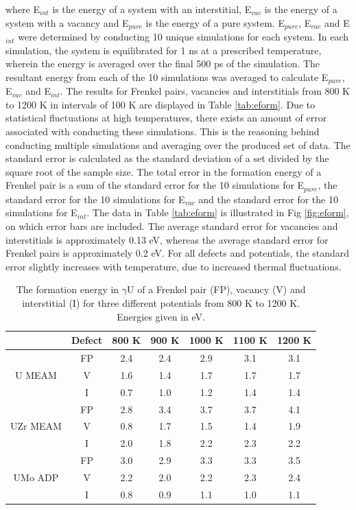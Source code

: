\documentclass[review]{elsarticle}
\begin{document}
where E$_{int}$ is the energy of a system with an interstitial, E$_{vac}$ is the energy of a system with a vacancy and E$_{pure}$ is the energy of a pure system. E$_{pure}$, E$_{vac}$ and E$_{int}$ were determined by conducting 10 unique simulations for each system. In each simulation, the system is equilibrated for 1 ns at a prescribed temperature, wherein the energy is averaged over the final 500 ps of the simulation. The resultant energy from each of the 10 simulations was averaged to calculate E$_{pure}$, E$_{vac}$ and E$_{int}$. The results for Frenkel pairs, vacancies and interstitials from 800 K to 1200 K in intervals of 100 K are displayed in Table \ref{tab:eform}. Due to statistical fluctuations at high temperatures, there exists an amount of error associated with conducting these simulations. This is the reasoning behind conducting multiple simulations and averaging over the produced set of data. The standard error is calculated as the standard deviation of a set divided by the square root of the sample size. The total error in the formation energy of a Frenkel pair is a sum of the standard error for the 10 simulations for E$_{pure}$, the standard error for the 10 simulations for E$_{vac}$ and the standard error for the 10 simulations for E$_{int}$. The data in Table \ref{tab:eform} is illustrated in Fig \ref{fig:eform}, on which error bars are included. The average standard error for vacancies and interstitials is approximately 0.13 eV, whereas the average standard error for Frenkel pairs is approximately 0.2 eV. For all defects and potentials, the standard error slightly increases with temperature, due to increased thermal fluctuations.

\begin{table}[h]
\caption{The formation energy in $\gamma$U of a Frenkel pair (FP), vacancy (V) and interstitial (I) for three different potentials from 800 K to 1200 K. Energies given in eV.} \label{tab:eform}
\begin{center}
\begin{tabular}{|c|c|c|c|c|c|c|}
	\hline
			& Defect	& 800 K & 900 K & 1000 K & 1100 K & 1200 K\\
	 \hline
			& FP	 & 2.4 & 2.4 & 2.9 & 3.1 & 3.1 \\
	 U MEAM 	& V	& 1.6 & 1.4 & 1.7 & 1.7 & 1.7 \\
	 		& I	& 0.7 & 1.0 & 1.2 & 1.4 & 1.4 \\
	\hline
	 		& FP	& 2.8 & 3.4 & 3.7 & 3.7 & 4.1 \\
	 UZr MEAM & V & 0.8 & 1.7 & 1.5 & 1.4 & 1.9 \\
			& I	& 2.0 & 1.8 & 2.2 & 2.3 & 2.2 \\
	 \hline
	 		& FP	& 3.0 & 2.9 & 3.3 & 3.3 & 3.5 \\
	 UMo ADP & V	& 2.2 & 2.0 & 2.2 & 2.3 & 2.4 \\
	 		& I	& 0.8 & 0.9 & 1.1 & 1.0 & 1.1 \\
	 \hline
\end{tabular}
\end{center}
\label{default}
\end{table}
\end{document}

